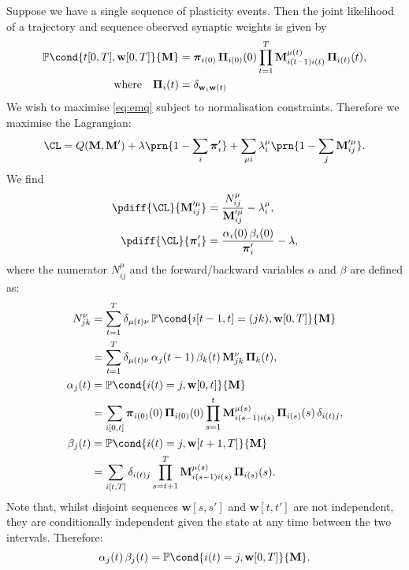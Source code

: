 \documentclass[12pt]{article}
\newcommand{\pib}{\boldsymbol{\pi}}
\newcommand{\Pib}{\boldsymbol{\Pi}}
\newcommand{\w}{\mathbf{w}}
\newcommand{\M}{\mathbf{M}}
\newcommand{\pr}{\mathbb{P}}
\begin{document}
Suppose we have a single sequence of plasticity events.
Then the joint likelihood of a trajectory and sequence observed synaptic weights is given by
%
\begin{equation}\label{eq:trajlike}
\begin{aligned}
  \pr\cond{t[0,T], \w[0,T]}{\M} &= \pib_{i(0)} \, \Pib_{i(0)}(0) 
        \prod_{t=1}^{T} \M^{\mu(t)}_{i(t-1)i(t)} \, \Pib_{i(t)}(t),\\
  \text{where}\quad
  \Pib_i(t) &= \delta_{\w_{i}\w(t)}
\end{aligned}
\end{equation}
%
We wish to maximise \eqref{eq:emq} subject to normalisation constraints.
Therefore we maximise the Lagrangian:
%
\begin{equation}\label{eq:lagrangesingle}
  \CL = Q(\M,\M') + \lambda\prn{1-\sum_i\pib'_i} + \sum_{\mu i} \lambda^\mu_i\prn{1-\sum_j\M'^\mu_{ij}}. 
\end{equation}
%
We find
%
\begin{equation}\label{eq:singlediffs}
\begin{aligned}
  \pdiff{\CL}{\M'^\mu_{ij}} &= \frac{N^\mu_{ij}}{\M'^\mu_{ij}} - \lambda^\mu_{i}, \\
  \pdiff{\CL}{\pib'_{i}} &= \frac{\alpha_i(0) \, \beta_i(0)}{\pib'_{i}} - \lambda,
\end{aligned}
\end{equation}
%
where the numerator $N^\mu_{ij}$ and the forward/backward variables $\alpha$ and $\beta$ are defined as:
%
\begin{equation}\label{eq:alphabeta}
\begin{aligned}
  N^\nu_{jk} &= \sum_{t=1}^{T} \delta_{\mu(t)\nu} \, \pr\cond{i[t-1,t]=(jk),\w[0,T]}{\M} \\
     &= \sum_{t=1}^{T} \delta_{\mu(t)\nu} \, \alpha_j(t-1) \, \beta_k(t) \, \M^{\nu}_{jk} \, \Pib_k(t) ,\\
  \alpha_j(t) &= \pr\cond{i(t)=j,\w[0,t]}{\M} \\
     &= \sum_{i[0,t]} \pib_{i(0)}(0) \, \Pib_{i(0)}(0) \prod_{s=1}^{t} \M^{\mu(s)}_{i(s-1)i(s)} \, \Pib_{i(s)}(s) \,\delta_{i(t)j}, \\
  \beta_j(t) &= \pr\cond{i(t)=j,\w[t+1,T]}{\M} \\
     &= \sum_{i[t,T]} \delta_{i(t)j} \prod_{s=t+1}^{T} \M^{\mu(s)}_{i(s-1)i(s)} \, \Pib_{i(s)}(s).
\end{aligned}
\end{equation}
%
Note that, whilst disjoint sequences $\w[s,s']$ and $\w[t,t']$ are not independent, they are conditionally independent given the state at any time between the two intervals.
Therefore:
%
\begin{equation}\label{eq:stateprob}
  \alpha_j(t) \, \beta_j(t) = \pr\cond{i(t)=j,\w[0,T]}{\M}.
\end{equation}
%
\end{document}
